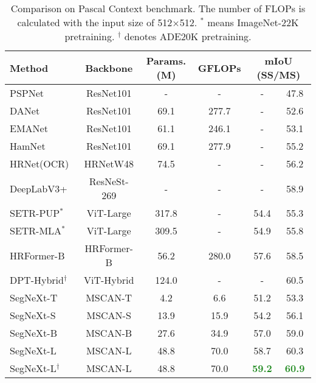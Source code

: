 \documentclass{article}
\begin{document}
\begin{table}[!t]\centering
\renewcommand{\arraystretch}{1}
\renewcommand{\tabcolsep}{3mm}
\small
\caption{Comparison on Pascal Context benchmark.
    	The number of FLOPs is calculated with the input size of 512$\times$512. 
    	$^{*}$ means ImageNet-22K pretraining.
    	$^{\dagger}$ denotes ADE20K pretraining.}
\begin{tabular}{l|c|c|c|cc}
\toprule
	Method & Backbone & Params.(M) & GFLOPs & \multicolumn{2}{c}{mIoU (SS/MS)}  \\
	\midrule
	PSPNet~\cite{zhao2017pyramid} & ResNet101 & - & - & - & 47.8  \\ 
	DANet~\cite{fu2019dual} & ResNet101 & 69.1 & 277.7 & - & 52.6  \\ 
    EMANet~\cite{li2019expectation} & ResNet101 & 61.1 & 246.1 & - & 53.1  \\ 
	HamNet~\cite{geng2021attention} & ResNet101 & 69.1 &  277.9 & - & 55.2  \\ 
	HRNet(OCR)~\cite{wang2020deep} & HRNetW48 & 74.5 & - & - & 56.2  \\ 
	DeepLabV3+~\cite{chen2018encoder} & ResNeSt-269 & - & - & - & 58.9  \\ 
	SETR-PUP$^{*}$~\cite{zheng2021rethinking} & ViT-Large & 317.8 & -  & 54.4 & 55.3  \\ 
	SETR-MLA$^{*}$~\cite{zheng2021rethinking} & ViT-Large & 309.5 & - & 54.9 & 55.8  \\ 
	HRFormer-B~\cite{yuan2021hrformer} & HRFormer-B  & 56.2 & 280.0 & 57.6 & 58.5  \\ 
	DPT-Hybrid$^{\dagger}$~\cite{ranftl2021vision} & ViT-Hybrid & 124.0 & - & - & 60.5  \\ 
	\midrule
    SegNeXt-T & MSCAN-T & 4.2 & 6.6 & 51.2 & 53.3  \\ 
    SegNeXt-S & MSCAN-S & 13.9 & 15.9 &  54.2 & 56.1 \\ 
	SegNeXt-B & MSCAN-B & 27.6 & 34.9 & 57.0 & 59.0 \\ 
	SegNeXt-L & MSCAN-L & 48.8 & 70.0 & 58.7 & 60.3  \\ \specialrule{0em}{0pt}{-1pt}
	SegNeXt-L$^{\dagger}$ & MSCAN-L & 48.8 & 70.0 &
	\textbf{\textcolor{ForestGreen}{59.2}} & \textbf{\textcolor{ForestGreen}{60.9}}  \\ 
\bottomrule
\end{tabular}
\label{tab:pascal_context}
\end{table}
\end{document}
